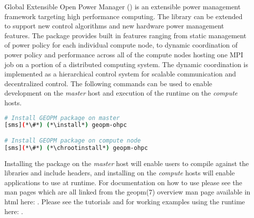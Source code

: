 Global Extensible Open Power Manager (\GEOPM{}) is an extensible power
management framework targeting high performance computing.  The library can be
extended to support new control algorithms and new hardware power management
features.  The \GEOPM{} package provides built in features ranging from static
management of power policy for each individual compute node, to dynamic
coordination of power policy and performance across all of the compute nodes
hosting one MPI job on a portion of a distributed computing system.  The
dynamic coordination is implemented as a hierarchical control system for
scalable communication and decentralized control.  The following
commands can be used to enable development on the {\em master} host and
execution of the \GEOPM{} runtime on the {\em compute} hosts.

\begin{lstlisting}[language=bash,keywords={},upquote=true]
# Install GEOPM package on master
[sms](*\#*) (*\install*) geopm-ohpc

# Install GEOPM package on compute node
[sms](*\#*) (*\chrootinstall*) geopm-ohpc
\end{lstlisting}

\noindent Installing the \GEOPM{} package on the {\em master} host will enable
users to compile against the \GEOPM{} libraries and include headers, and
installing on the {\em compute} hosts will enable applications to use
\GEOPM{} at runtime.  For documentation on how to use \GEOPM{} please see
the \GEOPM{} man pages which are all linked from the geopm(7) overview
man page available in html here:
\href{http://geopm.github.io/geopm/man/geopm.7.html}{\color{blue}{http://geopm.github.io/geopm/man/geopm.7.html}}.
Please see the \GEOPM{} tutorials and for working examples using the
\GEOPM{} runtime here:
\href{https://github.com/geopm/geopm/tree/dev/tutorial}{\color{blue}{https://github.com/geopm/geopm/tree/dev/tutorial}}.
